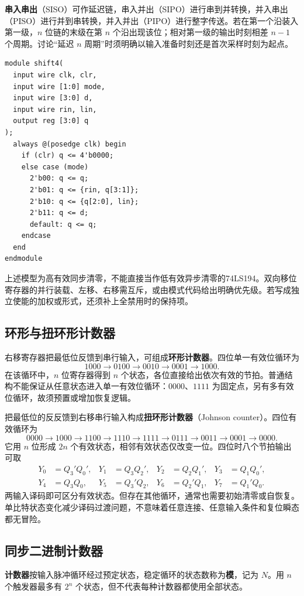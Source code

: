 \documentclass[UTF8,fontset=none,zihao=-4,a4paper]{ctexart}
\newcommand{\term}[1]{\textbf{#1}}
\begin{document}
\term{串入串出}（SISO）可作延迟链，串入并出（SIPO）进行串到并转换，并入串出（PISO）进行并到串转换，并入并出（PIPO）进行整字传送。若在第一个沿装入第一级，$n$ 位链的末级在第 $n$ 个沿出现该位；相对第一级的输出时刻相差 $n-1$ 个周期。讨论“延迟 $n$ 周期”时须明确以输入准备时刻还是首次采样时刻为起点。

\begin{lstlisting}
module shift4(
  input wire clk, clr,
  input wire [1:0] mode,
  input wire [3:0] d,
  input wire rin, lin,
  output reg [3:0] q
);
  always @(posedge clk) begin
    if (clr) q <= 4'b0000;
    else case (mode)
      2'b00: q <= q;
      2'b01: q <= {rin, q[3:1]};
      2'b10: q <= {q[2:0], lin};
      2'b11: q <= d;
      default: q <= q;
    endcase
  end
endmodule
\end{lstlisting}
上述模型为高有效同步清零，不能直接当作低有效异步清零的74LS194。双向移位寄存器的并行装载、左移、右移需互斥，或由模式代码给出明确优先级。若写成独立使能的加权或形式，还须补上全禁用时的保持项。

\subsection{环形与扭环形计数器}
右移寄存器把最低位反馈到串行输入，可组成\term{环形计数器}。四位单一有效位循环为
\[
1000\to0100\to0010\to0001\to1000.
\]
在该循环中，$n$ 位寄存器得到 $n$ 个状态，各位直接给出依次有效的节拍。普通结构不能保证从任意状态进入单一有效位循环：$0000$、$1111$ 为固定点，另有多有效位循环，故须预置或增加恢复逻辑。

把最低位的反反馈到右移串行输入构成\term{扭环形计数器}（Johnson counter）。四位有效循环为
\[
0000\to1000\to1100\to1110\to1111\to0111\to0011\to0001\to0000.
\]
它用 $n$ 位形成 $2n$ 个有效状态，相邻有效状态仅改变一位。四位时八个节拍输出可取
\begin{align*}
Y_0&=Q_3'Q_0',&Y_1&=Q_3Q_2',&Y_2&=Q_2Q_1',&Y_3&=Q_1Q_0',\\
Y_4&=Q_3Q_0,&Y_5&=Q_3'Q_2,&Y_6&=Q_2'Q_1,&Y_7&=Q_1'Q_0.
\end{align*}
两输入译码即可区分有效状态。但存在其他循环，通常也需要初始清零或自恢复。单比特状态变化减少译码过渡问题，不意味着任意连接、任意输入条件和复位瞬态都无冒险。

\subsection{同步二进制计数器}
\term{计数器}按输入脉冲循环经过预定状态，稳定循环的状态数称为\term{模}，记为 $N$。用 $n$ 个触发器最多有 $2^n$ 个状态，但不代表每种计数器都使用全部状态。
\end{document}
